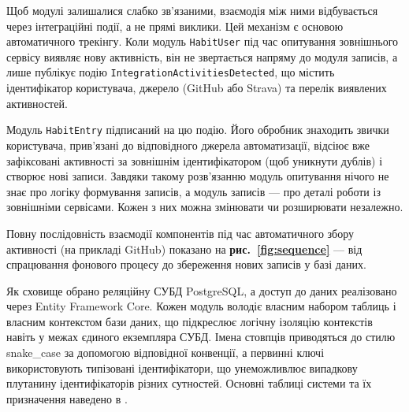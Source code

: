 Щоб модулі залишалися слабко зв'язаними, взаємодія між ними відбувається через інтеграційні події, а не прямі виклики. Цей механізм є основою автоматичного трекінгу. Коли модуль \texttt{HabitUser} під час опитування зовнішнього сервісу виявляє нову активність, він не звертається напряму до модуля записів, а лише публікує подію \texttt{IntegrationActivitiesDetected}, що містить ідентифікатор користувача, джерело (GitHub або Strava) та перелік виявлених активностей.

Модуль \texttt{HabitEntry} підписаний на цю подію. Його обробник знаходить звички користувача, прив'язані до відповідного джерела автоматизації, відсіює вже зафіксовані активності за зовнішнім ідентифікатором (щоб уникнути дублів) і створює нові записи. Завдяки такому розв'язанню модуль опитування нічого не знає про логіку формування записів, а модуль записів — про деталі роботи із зовнішніми сервісами. Кожен з них можна змінювати чи розширювати незалежно.

Повну послідовність взаємодії компонентів під час автоматичного збору активності (на прикладі GitHub) показано на \textbf{рис.~\ref{fig:sequence}} — від спрацювання фонового процесу до збереження нових записів у базі даних.



Як сховище обрано реляційну СУБД PostgreSQL, а доступ до даних реалізовано через Entity Framework Core. Кожен модуль володіє власним набором таблиць і власним контекстом бази даних, що підкреслює логічну ізоляцію контекстів навіть у межах єдиного екземпляра СУБД. Імена стовпців приводяться до стилю snake\_case за допомогою відповідної конвенції, а первинні ключі використовують типізовані ідентифікатори, що унеможливлює випадкову плутанину ідентифікаторів різних сутностей. Основні таблиці системи та їх призначення наведено в .

